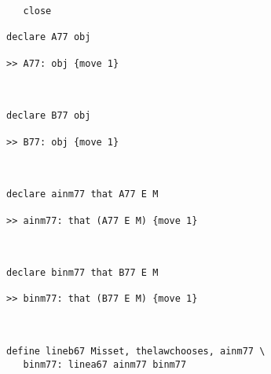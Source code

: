 \documentclass[12pt]{article}
\begin{document}
\begin{verbatim}
   close

declare A77 obj

>> A77: obj {move 1}



declare B77 obj

>> B77: obj {move 1}



declare ainm77 that A77 E M

>> ainm77: that (A77 E M) {move 1}



declare binm77 that B77 E M

>> binm77: that (B77 E M) {move 1}



define lineb67 Misset, thelawchooses, ainm77 \
   binm77: linea67 ainm77 binm77


\end{verbatim}
\end{document}
